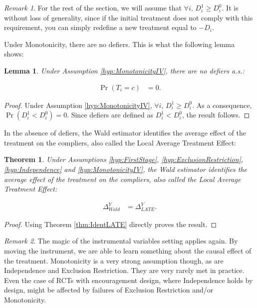 \documentclass[
]{book}
\newtheorem{theorem}{Theorem}[chapter]
\newtheorem{lemma}{Lemma}[chapter]
\theoremstyle{definition}
\theoremstyle{definition}
\theoremstyle{definition}
\theoremstyle{definition}
\theoremstyle{remark}
\newtheorem*{remark}{Remark}
\begin{document}
\begin{remark}
\iffalse{} {Remark. } \fi{}For the rest of the section, we will assume that \(\forall i\), \(D^1_i\geq D_i^0\).
It is without loss of generality, since if the initial treatment does not comply with this requirement, you can simply redefine a new treatment equal to \(-D_i\).
\end{remark}

Under Monotonicity, there are no defiers.
This is what the following lemma shows:

\begin{lemma}
\protect\hypertarget{lem:NoDefiers}{}{\label{lem:NoDefiers} }Under Assumption \ref{hyp:MonotonicityIV}, there are no defiers a.s.:

\begin{align*}
  \Pr(T_i=c) & = 0.
\end{align*}
\end{lemma}

\begin{proof}
\iffalse{} {Proof. } \fi{}Under Assumption \ref{hyp:MonotonicityIV}, \(\forall i\), \(D^1_i\geq D_i^0\).
As a consequence, \(\Pr(D^1_i < D_i^0)=0\).
Since defiers are defined as \(D^1_i < D_i^0\), the result follows.
\end{proof}

In the absence of defiers, the Wald estimator identifies the average effect of the treatment on the compliers, also called the Local Average Treatment Effect:

\begin{theorem}
\protect\hypertarget{thm:IdentLATEIV}{}{\label{thm:IdentLATEIV} }Under Assumptions \ref{hyp:FirstStage}, \ref{hyp:ExclusionRestriction}, \ref{hyp:Independence} and \ref{hyp:MonotonicityIV}, the Wald estimator identifies the average effect of the treatment on the compliers, also called the Local Average Treatment Effect:

\begin{align*}
  \Delta^Y_{Wald}& = \Delta^Y_{LATE}.
\end{align*}
\end{theorem}

\begin{proof}
\iffalse{} {Proof. } \fi{}Using Theorem \ref{thm:IdentLATE} directly proves the result.
\end{proof}

\begin{remark}
\iffalse{} {Remark. } \fi{}The magic of the instrumental variables setting applies again.
By moving the instrument, we are able to learn something about the causal effect of the treatment.
Monotonicity is a very strong assumption though, as are Independence and Exclusion Restriction.
They are very rarely met in practice.
Even the case of RCTs with encouragement design, where Independence holds by design, might be affected by failures of Exclusion Restriction and/or Monotonicity.
\end{remark}
\end{document}
